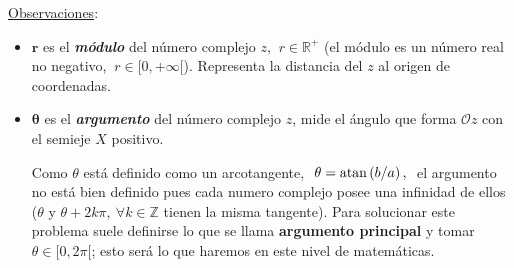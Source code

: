 \underline{Observaciones}:

\begin{itemize}
\item $\boldsymbol r$ es el \textbf{\emph{módulo}} del número complejo $z$, $\ r \in \mathbb R^+$ (el módulo es un número real no negativo, $ \ r\in [0,+\infty[$). Representa la distancia del $z$ al origen de coordenadas.

\item $\boldsymbol \theta$ es el \textbf{\emph{argumento}} del número complejo $z$, mide el ángulo que forma $\mathcal O z$ con el semieje $X$ positivo.

Como $\theta$ está definido como un arcotangente, $\ \theta =\atan \, (b/a) \, , \ $ el argumento no está bien definido pues cada numero complejo posee una infinidad de ellos ($\theta$ y $\theta+2k\pi,\ \forall k\in \mathbb Z$ tienen la misma tangente). Para solucionar este problema suele definirse lo que se llama \textbf{argumento principal} y tomar $\theta \in [0,2\pi[$; esto será lo que haremos en este nivel de matemáticas.
\end{itemize}


